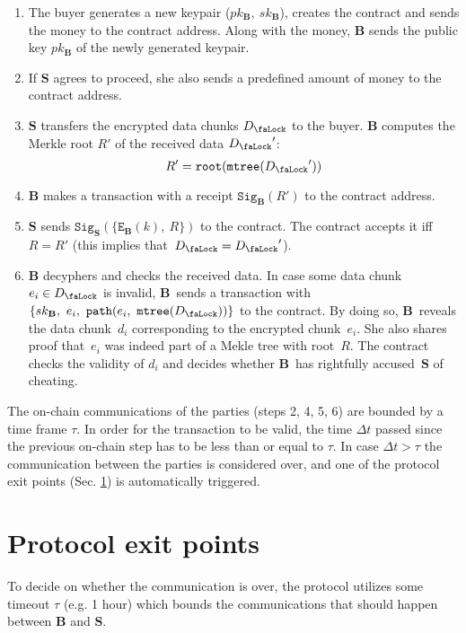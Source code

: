 \documentclass[a4paper]{article}
\newcommand{\Lock}{{D_\text{\faLock}}}
\newcommand{\Sign}{\mathtt{Sig}}
\newcommand{\Encrypt}{\mathtt{E}}
\newcommand{\MerkleTree}{\mathtt{mtree}}
\newcommand{\Root}{\mathtt{root}}
\newcommand{\Path}{\mathtt{path}}
\newcommand{\Party}[1]{\mathbf{#1}}
\newcommand{\tParty}[1]{$\Party{#1}$}
\newcommand{\PubKey}[1]{pk_{\Party{#1}}}
\newcommand{\SecretKey}[1]{sk_{\Party{#1}}}
\begin{document}
\begin{enumerate}
\item The buyer generates a new keypair ($\PubKey{B},\ \SecretKey{B}$), creates the contract and sends the money to the contract address. Along with the money, \tParty{B} sends the public key $\PubKey{B}$ of the newly generated keypair.
\item If \tParty{S} agrees to proceed, she also sends a predefined amount of money to the contract address.
\item \tParty{S} transfers the encrypted data chunks $\Lock$ to the buyer. \tParty{B} computes the Merkle root $R'$ of the received data $\Lock'$:
\begin{equation}
R' = \Root(\MerkleTree(\Lock'))
\end{equation}
\item \tParty{B} makes a transaction with a receipt $\Sign_\Party{B}(R')$ to the contract address.
\item \tParty{S} sends $\Sign_\Party{S}(\{\Encrypt_\Party{B}(k),\ R\})$ to the contract. The contract accepts it iff~$R=R'$ (this implies that~$\Lock=\Lock'$).
\item \tParty{B} decyphers and checks the received data. In case some data chunk $e_i \in \Lock$ is invalid, \tParty{B}~sends a transaction with~$\{\SecretKey{B},\ e_i,\ \Path(e_i,\ \MerkleTree(\Lock))\}$ to the contract. By doing so, \tParty{B}~reveals the data chunk~$d_i$ corresponding to the encrypted chunk~$e_i$.  She also shares proof that~$e_i$ was indeed part of a  Mekle tree with root~$R$. The contract checks the validity of $d_i$ and decides whether \tParty{B}~has rightfully accused~\tParty{S} of cheating.
\end{enumerate}

The on-chain communications of the parties (steps 2, 4, 5, 6) are bounded by a time frame $\tau$. In order for the transaction to be valid, the time $\Delta t$ passed since the previous on-chain step has to be less than or equal to $\tau$. In case $\Delta t > \tau$ the communication between the parties is considered over, and one of the protocol exit points (Sec. \ref{sec:exit-points}) is automatically triggered.

\section{Protocol exit points}
\label{sec:exit-points}
To decide on whether the communication is over, the protocol utilizes some timeout $\tau$ (e.g. 1 hour) which bounds the communications that should happen between \tParty{B} and \tParty{S}.
\end{document}
